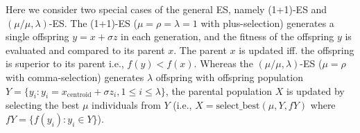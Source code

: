 

Here we consider two special cases of the general ES, namely (1+1)-ES and $(\mu/\mu,\lambda)$-ES. The (1+1)-ES ($\mu = \rho = \lambda=1$ with plus-selection) generates a single offspring $y = x + \sigma z$ in each generation, and the fitness of the offspring $y$ is evaluated and compared to its parent $x$. The parent $x$ is updated iff. the offspring is superior to its parent i.e., $f(y)<f(x)$. Whereas the $(\mu/\mu,\lambda)$-ES ($\mu=\rho$ with comma-selection) generates $\lambda$ offspring with offspring population $Y = \{ y_i: y_i = x_{\text{centroid}} + \sigma z_i, 1\leq i \leq \lambda \}$, the parental population $X$ is updated by selecting the best $\mu$ individuals from $Y$ (i.e., $X = \text{select\_best}(\mu,Y,fY)$ where $fY = \{f(y_i):y_i \in Y \}$). 



